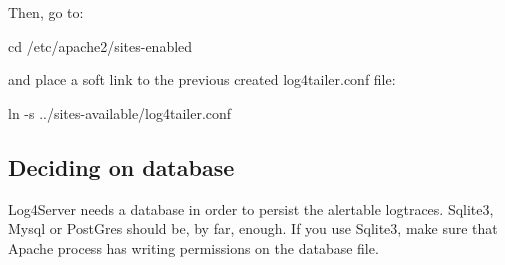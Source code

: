 Then, go to:

\begin{cmd}
    cd /etc/apache2/sites-enabled
\end{cmd}
and place a soft link to the previous created log4tailer.conf file:

\begin{cmd}
    ln -s ../sites-available/log4tailer.conf
\end{cmd}


\subsection{Deciding on database}

Log4Server needs a database in order to persist the alertable logtraces.
Sqlite3, Mysql or PostGres should be, by far, enough. If you use Sqlite3, make
sure that Apache process has writing permissions on the database file. 


\newpage
